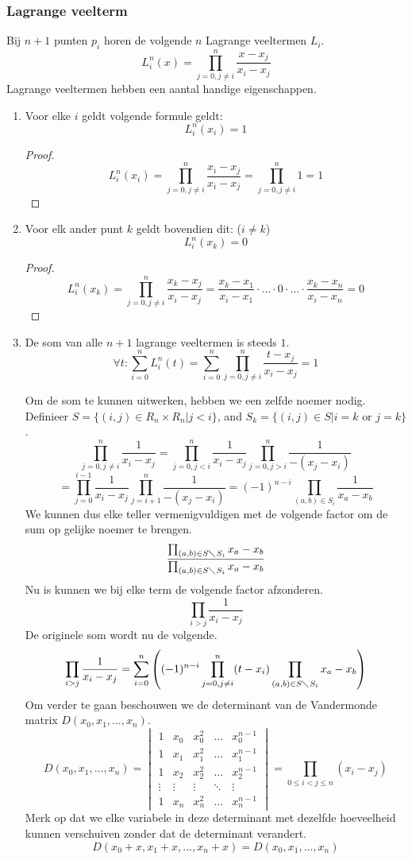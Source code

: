 \documentclass[tmi_notities.tex]{subfiles}
\begin{document}
\subsubsection{Lagrange veelterm}
Bij $n+1$ punten $p_i$ horen de volgende $n$ Lagrange veeltermen $L_i$.
\[
L_{i}^{n}(x) = \prod_{j=0, j \neq i}^{n} \frac{x-x_{j}}{x_{i}-x_{j}}
\]
Lagrange veeltermen hebben een aantal handige eigenschappen.
\begin{enumerate}
\item Voor elke $i$ geldt volgende formule geldt:
\[
L_{i}^{n}(x_i) = 1
\]
\begin{proof}

\[
L_{i}^{n}(x_i)
= \prod_{j=0, j \neq i}^{n} \frac{x_i-x_{j}}{x_{i}-x_{j}}
= \prod_{j=0, j \neq i}^{n} 1
= 1
\]
\end{proof}
\item Voor elk ander punt $k$ geldt bovendien dit: ($i\neq k$)
\[
L_i^{n}(x_k) = 0
\]
\begin{proof}
\[
L_{i}^{n}(x_k)
= \prod_{j=0, j \neq i}^{n} \frac{x_k-x_{j}}{x_{i}-x_{j}}
= \frac{x_k-x_{1}}{x_{i}-x_{1}}\cdot \ldots \cdot 0 \cdot \ldots \cdot \frac{x_k-x_{n}}{x_{i}-x_{n}}
= 0
\]
\end{proof}
\item De som van alle $n+1$ lagrange veeltermen is steeds $1$.
\[
\forall t: \sum_{i=0}^{n}L_i^{n}(t) = \sum_{i=0}^{n}\prod_{j=0, j \neq i}^{n} \frac{t-x_{j}}{x_{i}-x_{j}} = 1
\]

\iffalse
Om de som te kunnen uitwerken, hebben we een zelfde noemer nodig. Definieer $S=\{(i,j)\in R_n\times R_n |j<i\}$, and $S_k=\{(i,j)\in S | i=k\text{ or }j=k\}$.
\[
\prod_{j=0,j\neq i}^{n}\frac{1}{x_{i}-x_{j}}
= \prod_{j=0,j < i}^{n}\frac{1}{x_{i}-x_{j}}
  \prod_{j=0,j > i}^{n}\frac{1}{-(x_{j}-x_{i})}
\]
\[
= \prod_{j=0}^{i-1}\frac{1}{x_{i}-x_{j}}
  \prod_{j=i+1}^{n}\frac{1}{-(x_{j}-x_{i})}
= (-1)^{n-i}\prod_{(a,b)\in S_{i}}\frac{1}{x_{a}-x_{b}}
\]
We kunnen dus elke teller vermenigvuldigen met de volgende factor om de sum op gelijke noemer te brengen.
\[
\frac{\prod_{(a,b)\in S\diagdown S_{i}}x_a-x_b}{\prod_{(a,b)\in S\diagdown S_{i}}x_a-x_b}
\]
Nu is kunnen we bij elke term de volgende factor afzonderen.
\[
\prod_{i > j}\frac{1}{x_i-x_j}
\]
De originele som wordt nu de volgende.
\[
\prod_{i > j}\frac{1}{x_i-x_j}
= \sum_{i=0}^n
\left(
(-1)^{n-i}\prod_{j=0,j\neq i}^n(t-x_i)\prod_{(a,b)\in S\diagdown S_{i}}x_a-x_b
\right)
\]
Om verder te gaan beschouwen we de determinant van de Vandermonde matrix $D(x_0,x_1,...,x_n)$.
\[
D(x_0,x_1,...,x_n)
=
\begin{vmatrix}
1 & x_0 & x_0^2 & \dots & x_0^{n-1}\\
1 & x_1 & x_1^2 & \dots & x_1^{n-1}\\
1 & x_2 & x_2^2 & \dots & x_2^{n-1}\\
\vdots & \vdots & \vdots & \ddots &\vdots \\
1 & x_n & x_n^2 & \dots & x_n^{n-1}
\end{vmatrix}
= \prod_{0 \leq i< j \leq n} (x_i-x_j)
\]
Merk op dat we elke variabele in deze determinant met dezelfde hoeveelheid kunnen verschuiven zonder dat de determinant verandert.
\[
D(x_0+x,x_1+x,...,x_n+x) = D(x_0,x_1,...,x_n)
\]


\end{enumerate}
\end{document}
